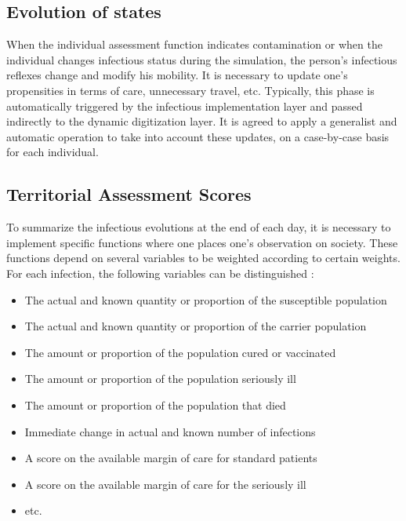 \subsection{Evolution of states}

When the individual assessment function indicates contamination or when the individual changes infectious status during the simulation, the person's infectious reflexes change and modify his mobility. It is necessary to update one's propensities in terms of care, unnecessary travel, etc. Typically, this phase is automatically triggered by the infectious implementation layer and passed indirectly to the dynamic digitization layer. It is agreed to apply a generalist and automatic operation to take into account these updates, on a case-by-case basis for each individual.\\

\subsection{Territorial Assessment Scores}

To summarize the infectious evolutions at the end of each day, it is necessary to implement specific functions where one places one's observation on society. These functions depend on several variables to be weighted according to certain weights. For each infection, the following variables can be distinguished :\\

\begin{itemize}
\item The actual and known quantity or proportion of the susceptible population
\item The actual and known quantity or proportion of the carrier population
\item The amount or proportion of the population cured or vaccinated
\item The amount or proportion of the population seriously ill
\item The amount or proportion of the population that died
\item Immediate change in actual and known number of infections
\item A score on the available margin of care for standard patients
\item A score on the available margin of care for the seriously ill
\item etc.\\
\end{itemize}


